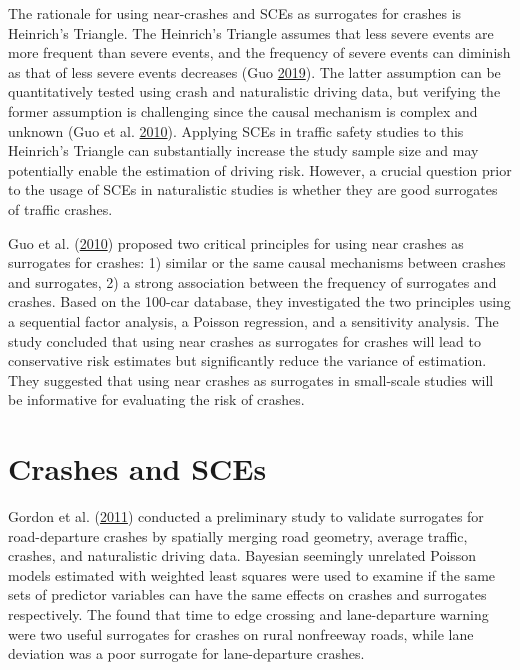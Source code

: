 \documentclass[12pt]{book}
\numberwithin{equation}{chapter}
\begin{document}
The rationale for using near-crashes and SCEs as surrogates for crashes is Heinrich's Triangle. The Heinrich's Triangle assumes that less severe events are more frequent than severe events, and the frequency of severe events can diminish as that of less severe events decreases (Guo \protect\hyperlink{ref-guo2019statistical}{2019}). The latter assumption can be quantitatively tested using crash and naturalistic driving data, but verifying the former assumption is challenging since the causal mechanism is complex and unknown (Guo et al. \protect\hyperlink{ref-guo2010near}{2010}). Applying SCEs in traffic safety studies to this Heinrich's Triangle can substantially increase the study sample size and may potentially enable the estimation of driving risk. However, a crucial question prior to the usage of SCEs in naturalistic studies is whether they are good surrogates of traffic crashes.

Guo et al. (\protect\hyperlink{ref-guo2010near}{2010}) proposed two critical principles for using near crashes as surrogates for crashes: 1) similar or the same causal mechanisms between crashes and surrogates, 2) a strong association between the frequency of surrogates and crashes. Based on the 100-car database, they investigated the two principles using a sequential factor analysis, a Poisson regression, and a sensitivity analysis. The study concluded that using near crashes as surrogates for crashes will lead to conservative risk estimates but significantly reduce the variance of estimation. They suggested that using near crashes as surrogates in small-scale studies will be informative for evaluating the risk of crashes.

\hypertarget{crashes-and-sces}{%
\section{Crashes and SCEs}\label{crashes-and-sces}}

Gordon et al. (\protect\hyperlink{ref-gordon2011analysis}{2011}) conducted a preliminary study to validate surrogates for road-departure crashes by spatially merging road geometry, average traffic, crashes, and naturalistic driving data. Bayesian seemingly unrelated Poisson models estimated with weighted least squares were used to examine if the same sets of predictor variables can have the same effects on crashes and surrogates respectively. The found that time to edge crossing and lane-departure warning were two useful surrogates for crashes on rural nonfreeway roads, while lane deviation was a poor surrogate for lane-departure crashes.
\end{document}
